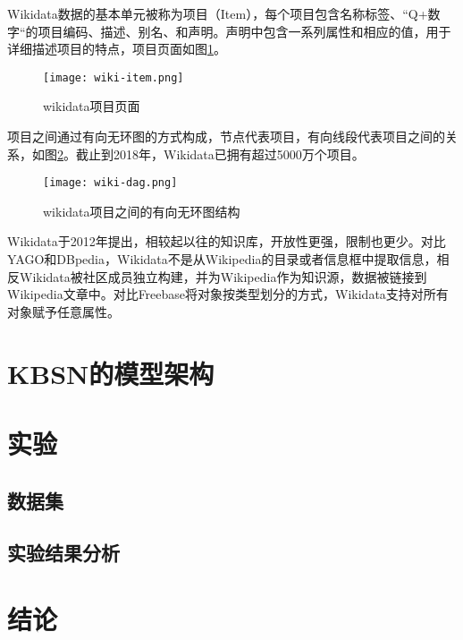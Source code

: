 Wikidata数据的基本单元被称为项目（Item），每个项目包含名称标签、“Q+数字“的项目编码、描述、别名、和声明。声明中包含一系列属性和相应的值，用于详细描述项目的特点，项目页面如图\ref{wiki-item}。
\begin{figure}[H]
	\centering
	\texttt{[image: wiki-item.png]}
	\caption{wikidata项目页面}
	\label{wiki-item}
\end{figure}
项目之间通过有向无环图的方式构成，节点代表项目，有向线段代表项目之间的关系，如图\ref{wiki-dag}。截止到2018年，Wikidata已拥有超过5000万个项目。
\begin{figure}[H]
	\centering
	\texttt{[image: wiki-dag.png]}
	\caption{wikidata项目之间的有向无环图结构}
	\label{wiki-dag}
\end{figure}

Wikidata于2012年提出，相较起以往的知识库，开放性更强，限制也更少。对比YAGO和DBpedia，Wikidata不是从Wikipedia的目录或者信息框中提取信息，相反Wikidata被社区成员独立构建，并为Wikipedia作为知识源，数据被链接到Wikipedia文章中。对比Freebase将对象按类型划分的方式，Wikidata支持对所有对象赋予任意属性。

\section{KBSN的模型架构}

\section{实验}
\subsection{数据集}
\subsection{实验结果分析}

\section{结论}
